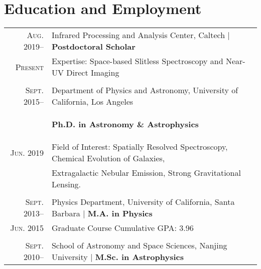 \documentclass[letterpaper,10pt]{article}
\newcommand{\narrow}{-1.8ex}
\newcommand{\xnarrow}{-2.9ex}
\begin{document}
\section{Education and Employment}
\vspace*{1ex}
\begin{tabular}{r|p{5.7in}}
    \textsc{Aug. 2019}--      &   Infrared Processing and Analysis Center, Caltech    |   \textbf{Postdoctoral Scholar}   \\
    \textsc{Present}          &   Expertise: Space-based Slitless Spectroscopy and Near-UV Direct Imaging \\
    \multicolumn{2}{c}{} \\[\narrow]
    \textsc{Sept. 2015}--     & Department of Physics and Astronomy, University of California, Los Angeles \\[\narrow]
                              &   \begin{flushright}
                                      \textbf{Ph.D. in Astronomy \& Astrophysics}
                                  \end{flushright}    \\[\xnarrow]
    \textsc{Jun. 2019}        & Field of Interest: Spatially Resolved Spectroscopy, Chemical Evolution of Galaxies, \\
                              & \hspace*{7.4em} Extragalactic Nebular Emission, Strong Gravitational Lensing. \\
    \multicolumn{2}{c}{} \\[\narrow]
    \textsc{Sept. 2013}--     & Physics Department, University of California, Santa Barbara    |   \textbf{M.A. in Physics}   \\
    \textsc{Jun. 2015}        & Graduate Course Cumulative GPA: 3.96     \\
    \multicolumn{2}{c}{} \\[\narrow]
    \textsc{Sept. 2010}--     & School of Astronomy and Space Sciences, Nanjing University  |  \textbf{M.Sc. in Astrophysics}   \\

\end{tabular}
\end{document}
